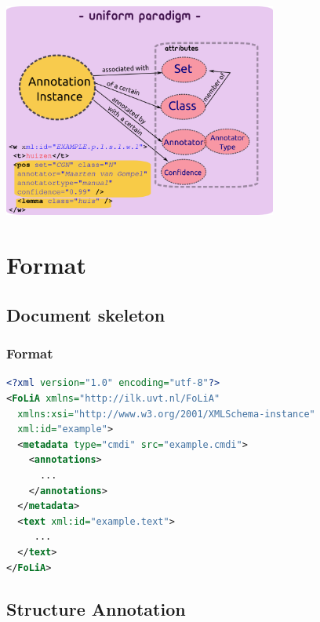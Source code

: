 \documentclass[compress,10pt]{beamer}
\begin{document}
\begin{frame}
        \begin{center}
        \includegraphics[width=90.0mm]{paradigm.png}
        \end{center}
\end{frame}


\section{Format}

\subsection{Document skeleton}

\begin{frame}[fragile]
\frametitle{Format}
\begin{lstlisting}[language=xml]
<?xml version="1.0" encoding="utf-8"?>
<FoLiA xmlns="http://ilk.uvt.nl/FoLiA"
  xmlns:xsi="http://www.w3.org/2001/XMLSchema-instance"
  xml:id="example">
  <metadata type="cmdi" src="example.cmdi">    
    <annotations>
      ...
    </annotations>   
  </metadata>
  <text xml:id="example.text">
     ...
  </text>
</FoLiA>  
\end{lstlisting}
\end{frame}

\subsection{Structure Annotation}
\end{document}

